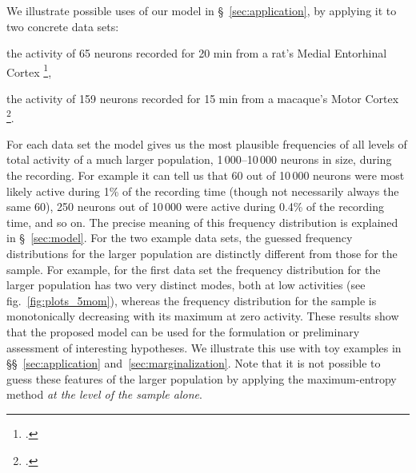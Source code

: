 \documentclass[\ifafour a4paper,12pt,\else a5paper,10pt,\fi%
onecolumn,oneside,article,%
british%
]{memoir}
\theoremstyle{remark}
\theoremstyle{innote}
\newcommand*{\citep}{\footcites}
\renewcommand*{\|}{\nonscript\,\vert\nonscript\;\mathopen{}}
\newcommand*{\sect}{\S}%
\newcommand*{\sects}{\S\S}%
\newcommand*{\fig}{fig.}%
\begin{document}
We illustrate possible uses of our model in \sect~\ref{sec:application}, by
applying it to two concrete data sets:
\begin{enumerate*}[label=(\alph*)]
\item the activity of 65 neurons recorded for 20 min from a rat's Medial
  Entorhinal Cortex \citep{stensolaetal2012},
\item the activity of 159 neurons recorded for 15 min from a macaque's
  Motor Cortex \citep{rostamietal2016_r2017}.
\end{enumerate*}
For each data set the model gives us the most plausible frequencies of all
levels of total activity of a much larger population, 1\,000--10\,000
neurons in size, during the recording. For example it can tell us that 60
out of 10\,000 neurons were most likely active during 1\% of the recording
time (though not necessarily always the same 60), 250 neurons out of
10\,000 were active during 0.4\% of the recording time, and so on. The
precise meaning of this frequency distribution is explained in
\sect~\ref{sec:model}. For the two example data sets, the guessed frequency
distributions for the larger population are distinctly different from those
for the sample. For example, for the first data set the frequency
distribution for the larger population has two very distinct modes, both at
low activities %
(see \fig~\ref{fig:plots_5mom}), whereas the frequency distribution for the
sample is monotonically decreasing with its maximum at zero activity. These
results show that the proposed model can be used for the formulation or
preliminary assessment of interesting hypotheses. We illustrate this use
with toy examples in \sects~\ref{sec:application}
and~\ref{sec:marginalization}. Note that it is not possible to guess these
features of the larger population by applying the maximum-entropy method
\emph{at the level of the sample alone}.

\end{document}
